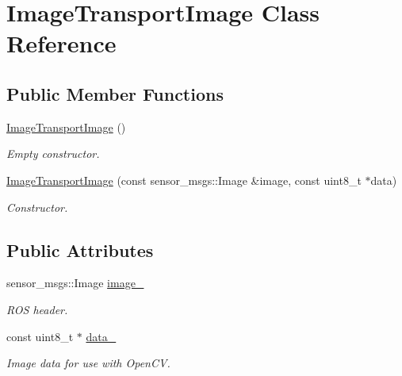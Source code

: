 \hypertarget{class_image_transport_image}{\section{Image\-Transport\-Image Class Reference}
\label{class_image_transport_image}
}
\subsection*{Public Member Functions}
\begin{DoxyCompactItemize}
\item 
\hypertarget{class_image_transport_image_a6c74ec4d27c68370d48d008d561a6f3f}{\hyperlink{class_image_transport_image_a6c74ec4d27c68370d48d008d561a6f3f}{Image\-Transport\-Image} ()}\label{class_image_transport_image_a6c74ec4d27c68370d48d008d561a6f3f}

\begin{DoxyCompactList}\small\item\em Empty constructor. \end{DoxyCompactList}\item 
\hypertarget{class_image_transport_image_a902a6c93889d96ca6c4091605f80caa0}{\hyperlink{class_image_transport_image_a902a6c93889d96ca6c4091605f80caa0}{Image\-Transport\-Image} (const sensor\-\_\-msgs\-::\-Image \&image, const uint8\-\_\-t $\ast$data)}\label{class_image_transport_image_a902a6c93889d96ca6c4091605f80caa0}

\begin{DoxyCompactList}\small\item\em Constructor. \end{DoxyCompactList}\end{DoxyCompactItemize}
\subsection*{Public Attributes}
\begin{DoxyCompactItemize}
\item 
\hypertarget{class_image_transport_image_a3e845cce708fc474bbda45d0e3881a7d}{sensor\-\_\-msgs\-::\-Image \hyperlink{class_image_transport_image_a3e845cce708fc474bbda45d0e3881a7d}{image\-\_\-}}\label{class_image_transport_image_a3e845cce708fc474bbda45d0e3881a7d}

\begin{DoxyCompactList}\small\item\em R\-O\-S header. \end{DoxyCompactList}\item 
\hypertarget{class_image_transport_image_a8b947bf6752841d10eaa442317f13f0b}{const uint8\-\_\-t $\ast$ \hyperlink{class_image_transport_image_a8b947bf6752841d10eaa442317f13f0b}{data\-\_\-}}\label{class_image_transport_image_a8b947bf6752841d10eaa442317f13f0b}

\begin{DoxyCompactList}\small\item\em Image data for use with Open\-C\-V. \end{DoxyCompactList}\end{DoxyCompactItemize}



